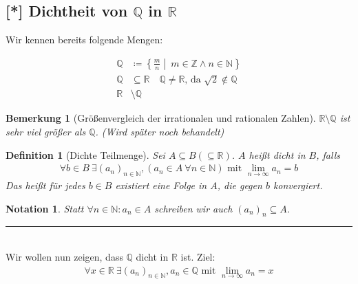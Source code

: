 \documentclass[11pt, twoside, a4paper]{article}
\theoremstyle{plain}
\newtheorem{bemerkung}[blockelement]{Bemerkung}
\newtheorem{definition}[blockelement]{Definition}
\newtheorem{notation}[blockelement]{Notation}
\newcommand{\set}[1]{\left\{#1\right\}}
\newcommand{\definedas}[0]{\coloneqq}
\newcommand{\exclude}[0]{\setminus}
\newcommand{\fromto}{\rightarrow{}}
\newcommand{\naturalnumbers}{\mathbb{N}}
\newcommand{\realnumbers}{\mathbb{R}}
\newcommand{\horizontalline}[0]{\par\noindent\rule{0.05\textwidth}{0.1pt}\\}
\begin{document}
    \newpage

    \subsection{[*] Dichtheit von $\mathbb{Q}$ in $\mathbb{R}$}

    Wir kennen bereits folgende Mengen:

    \begin{align*}
        \mathbb{Q}&\definedas\set{\frac{m}{n}\middle|~m\in\mathbb{Z} \land n\in\naturalnumbers}\tag{Rationale Zahlen}\\
        \mathbb{Q}&\subseteq \realnumbers\quad \mathbb{Q}\neq\mathbb{R}\text{, da } \sqrt{2}\notin \mathbb{Q}\\
        \mathbb{R}&\exclude\mathbb{Q} \tag{Irrationale Zahlen}
    \end{align*}

    \begin{bemerkung}[Größenvergleich der irrationalen und rationalen Zahlen]
        $\realnumbers\exclude\mathbb{Q}$ ist sehr viel größer als $\mathbb{Q}$. (Wird später noch behandelt)
    \end{bemerkung}

    \begin{definition}[Dichte Teilmenge] %
        Sei $A\subseteq B (\subseteq \realnumbers)$. $A$ heißt dicht in $B$, falls
        \begin{align*}
            \forall b\in B~\exists (a_n)_{n\in\naturalnumbers}, (a_n \in A~\forall n\in\naturalnumbers)\text{ mit }\lim_{n\fromto\infty} a_n = b
        \end{align*}
        Das heißt für jedes $b\in B$ existiert eine Folge in $A$, die gegen $b$ konvergiert.
    \end{definition}

    \begin{notation}
        Statt $\forall n\in\naturalnumbers\colon a_n \in A$ schreiben wir auch $(a_n)_n\subseteq A$.
    \end{notation}
    \horizontalline
    \noindent Wir wollen nun zeigen, dass $\mathbb{Q}$ dicht in $\realnumbers$ ist. Ziel:
    \begin{align*}
        \forall x\in\realnumbers~\exists (a_n)_{n\in\naturalnumbers}, a_n\in\mathbb{Q}\text{ mit }\lim_{n\fromto\infty} a_n =x
    \end{align*}
\end{document}
